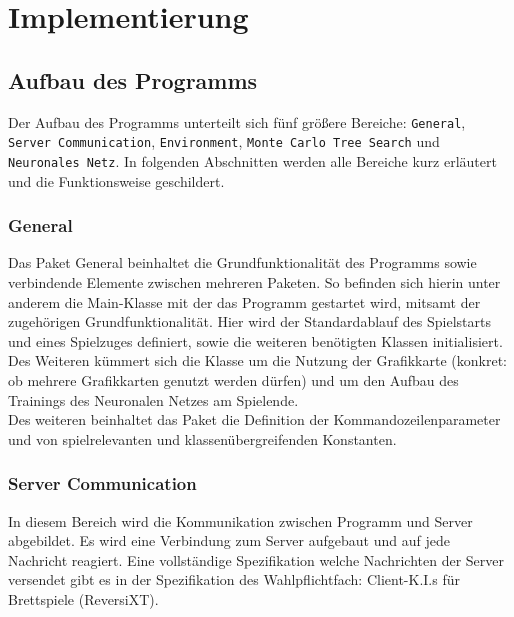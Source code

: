 \documentclass[12pt,a4paper]{article}
\begin{document}
\newpage
\section{Implementierung}

\subsection{Aufbau des Programms}
Der Aufbau des Programms unterteilt sich fünf größere Bereiche: \texttt{General}, \texttt{Server Communication}, \texttt{Environment}, \texttt{Monte Carlo Tree Search} und \texttt{Neuronales Netz}. In folgenden Abschnitten werden alle Bereiche kurz erläutert und die Funktionsweise geschildert.

\subsubsection{General}
Das Paket General beinhaltet die Grundfunktionalität des Programms sowie verbindende Elemente zwischen mehreren Paketen.
So befinden sich hierin unter anderem die Main-Klasse mit der das Programm gestartet wird, mitsamt der zugehörigen Grundfunktionalität. Hier wird der Standardablauf des Spielstarts und eines Spielzuges definiert, sowie die weiteren benötigten Klassen initialisiert. Des Weiteren k\"{u}mmert sich die Klasse um die Nutzung der Grafikkarte (konkret: ob mehrere Grafikkarten genutzt werden d\"{u}rfen) und um den Aufbau des Trainings des Neuronalen Netzes am Spielende.\\
Des weiteren beinhaltet das Paket die Definition der Kommandozeilenparameter und von spielrelevanten und klassenübergreifenden Konstanten.

\subsubsection{Server Communication}
In diesem Bereich wird die Kommunikation zwischen Programm und Server abgebildet. Es wird eine Verbindung zum Server aufgebaut und auf jede Nachricht reagiert. Eine vollständige Spezifikation welche Nachrichten der Server versendet gibt es in der Spezifikation des Wahlpflichtfach: Client-K.I.s für Brettspiele (ReversiXT).
\end{document}
